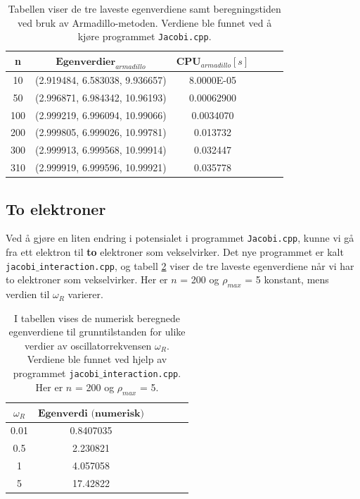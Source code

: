 \documentclass{article}
\begin{document}
\FloatBarrier
\begin{table}[!ht]
\centering
\caption{Tabellen viser de tre laveste egenverdiene samt beregningstiden ved bruk av Armadillo-metoden. Verdiene ble funnet ved å kjøre programmet \texttt{Jacobi.cpp}.}
\label{tab:armadillo}
\begin{tabular}{|c|c|c|c|c|c|}
\hline
\textbf{n}     &  $\textbf{Egenverdier}_{armadillo}$  &  $\textbf{CPU}_{armadillo} [s]$  \\ 
\hline
10     & (2.919484,   6.583038,   9.936657)  &8.0000E-05     \\ 
\hline
50 & (2.996871, 6.984342, 10.96193)  &     0.00062900        \\ 
\hline
100 & (2.999219, 6.996094, 10.99066)  & 0.0034070         \\ 
\hline
200 & (2.999805, 6.999026, 10.99781)  & 0.013732     \\ 
\hline   
300 & (2.999913, 6.999568, 10.99914) & 0.032447      \\ 
\hline   
310 & (2.999919, 6.999596, 10.99921)  & 0.035778     \\ 
\hline   
\end{tabular}
\end{table}
\FloatBarrier

\subsection{To elektroner}
Ved å gjøre en liten endring i potensialet i programmet \texttt{Jacobi.cpp}, kunne vi gå fra ett elektron til \textbf{to} elektroner som vekselvirker. Det nye programmet er kalt \texttt{jacobi$\_$interaction.cpp}, og tabell \ref{tab:jacobi_interact} viser de tre laveste egenverdiene når vi har to elektroner som vekselvirker. Her er $n$ = 200 og $\rho_{max}$ = 5 konstant, mens verdien til $\omega_R$ varierer. 

\FloatBarrier
\begin{table}[!ht]
\centering
\caption{I tabellen vises de numerisk beregnede egenverdiene til grunntilstanden for ulike verdier av oscillatorrekvensen $\omega_R$. Verdiene ble funnet ved hjelp av programmet \texttt{jacobi$\_$interaction.cpp}. Her er $n$ = 200 og $\rho_{max}$ = 5. }
\label{tab:jacobi_interact}
\begin{tabular}{|c|c|c|c|c|c|}
\hline
$\omega_R$  &  $\textbf{Egenverdi (numerisk)}$   \\ 
\hline
0.01     & 0.8407035     \\ 
\hline
0.5 & 2.230821           \\ 
\hline
1 & 4.057058       \\ 
\hline
5 & 17.42822    \\ 
\hline   
\end{tabular}
\end{table}
\FloatBarrier
\end{document}
